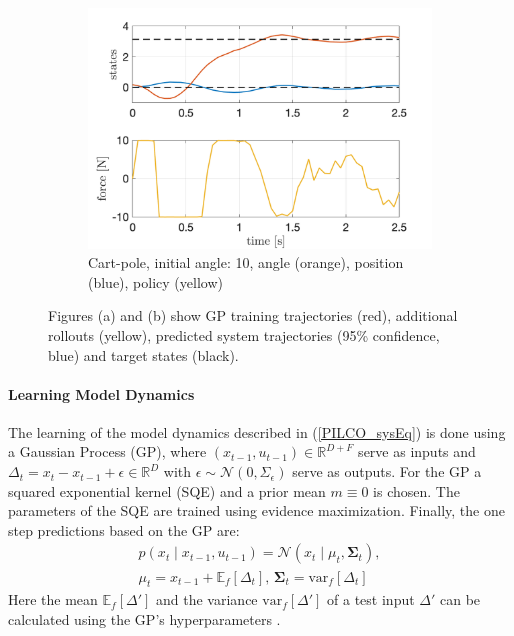 \documentclass[letterpaper, 10 pt, conference]{ieeeconf}  %
\begin{document}
\begin{figure}[!thp]
\begin{subfigure}{0.325\textwidth}
	\includegraphics[width=\textwidth]{cp_quad.png}
	\caption{Cart-pole, initial angle: 10\textdegree, angle (orange), position (blue), policy (yellow)}\label{fig:PILCO_cp}
	\end{subfigure}\caption{Figures (a) and (b) show GP training trajectories (red), additional rollouts (yellow), predicted system trajectories (95\% confidence, blue) and target states (black).}\label{fig:PILCO}
\end{figure} 
\paragraph{Learning Model Dynamics}
The learning of the model dynamics described in (\ref{PILCO_sysEq}) is done using a Gaussian Process (GP), where $\left(x_{t-1},u_{t-1}\right) \in \mathbb{R}^{D+F}$ serve as inputs and $\Delta_t = x_{t} - x_{t-1} + \epsilon \in \mathbb{R}^D$ with $\epsilon \sim \mathcal{N}\left(0,\Sigma_\epsilon\right)$ serve as outputs. For the GP a squared exponential kernel (SQE) and a prior mean $m\equiv 0$ is chosen. The parameters of the SQE %
are trained using evidence maximization. Finally, the one step predictions based on the GP are:
\begin{align}
p(x_t\mid x_{t-1}, u_{t-1}) = \mathcal{N} \left(x_t \mid \mu_t, \mathbf{\Sigma}_t \right),\label{PILCO_GPp}\\
\mu_t = x_{t-1} + \mathbb{E}_f \left[ \Delta_t \right],\, \mathbf{\Sigma}_t = \text{var}_f \left[ \Delta_t \right]\label{PILCO_GPmu_sigma}
\end{align}
Here the mean $\mathbb{E}_f\left[\Delta'\right]$ and the variance $\text{var}_f\left[\Delta'\right]$ of a test input $\Delta'$ can be calculated using the GP's hyperparameters \cite{PILCO_paper}.
\end{document}
